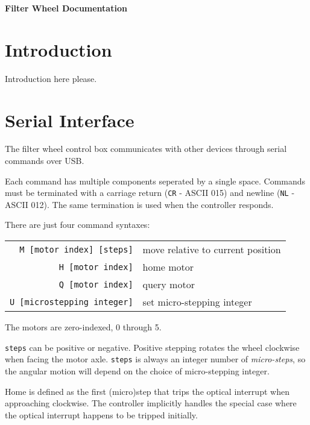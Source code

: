 \documentclass[11pt]{article}
\begin{document}
	
\begin{flushleft}
	{\Huge \textbf{Filter Wheel Documentation}}
\end{flushleft}

{\let\newpage\relax\begin{spacing}{0.1}\tableofcontents\end{spacing}}
\pagebreak
	
\section{Introduction}\label{sec:introduction}

Introduction here please.

\pagebreak
\section{Serial Interface}

The filter wheel control box communicates with other devices through serial commands over USB.

Each command has multiple components seperated by a single space. Commands must be terminated with a carriage return (\texttt{CR} - ASCII 015) and newline (\texttt{NL} - ASCII 012). The same termination is used when the controller responds.

There are just four command syntaxes:

\begin{center}
	\begin{tabular}{r | l}
		\texttt{M [motor index] [steps]} & move relative to current position \\ 
		\texttt{H [motor index]} & home motor \\
		\texttt{Q [motor index]} & query motor \\
		\texttt{U [microstepping integer]} & set micro-stepping integer
	\end{tabular}
\end{center}

The motors are zero-indexed, 0 through 5.

\texttt{steps} can be positive or negative. Positive stepping rotates the wheel clockwise when facing the motor axle. \texttt{steps} is always an integer number of \textit{micro-steps}, so the angular motion will depend on the choice of micro-stepping integer.

Home is defined as the first (micro)step that trips the optical interrupt when approaching clockwise. The controller implicitly handles the special case where the optical interrupt happens to be tripped initially.
\end{document}
